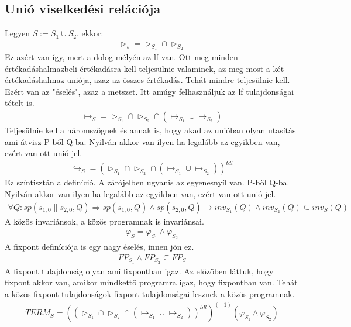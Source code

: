\documentclass{article}
\begin{document}
\subsection*{Unió viselkedési relációja}
Legyen $S:=S_1 \cup S_2$. ekkor:
\begin{align*}
\triangleright_s = \triangleright_{S_1} \cap \triangleright_{S_2}
\end{align*}
Ez azért van így, mert a dolog mélyén az lf van. Ott meg minden értékadáshalmazbeli értékadásra kell teljesülnie valaminek, az meg most a két értékadáshalmaz uniója, azaz az összes értékadás. Tehát mindre teljesülnie kell. Ezért van az "éselés", azaz a metszet. Itt amúgy felhasználjuk az lf tulajdonságai tételt is.
\begin{align*}
\mapsto_S = \triangleright_{S_1} \cap \triangleright_{S_2} \cap (\mapsto_{S_1} \cup \mapsto_{S_2})
\end{align*}
Teljesülnie kell a háromszögnek és annak is, hogy akad az unióban olyan utasítás ami átvisz P-ből Q-ba. Nyilván akkor van ilyen ha legalább az egyikben van, ezért van ott unió jel.
\begin{align*}
\hookrightarrow_S = (\triangleright_{S_1} \cap \triangleright_{S_2} \cap (\mapsto_{S_1} \cup \mapsto_{S_2}))^{tdl}
\end{align*}
Ez színtisztán a definíció. A zárójelben ugyanis az egyenesnyíl van.
P-ből Q-ba. Nyilván akkor van ilyen ha legalább az egyikben van, ezért van ott unió jel.
\begin{align*}
\forall Q:sp(s_{1,0}\parallel s_{2,0},Q) \Rightarrow sp(s_{1,0},Q) \land sp(s_{2,0},Q) \rightarrow inv_{S_1}(Q) \land inv_{S_2}(Q) \subseteq inv_S(Q)
\end{align*}
A közös invariánsok, a közös programnak is invariánsai.
\begin{align*}
\varphi_S = \varphi_{S_1} \land \varphi_{S_2}
\end{align*}
A fixpont definíciója is egy nagy éselés, innen jön ez.
\begin{align*}
FP_{S_1} \land FP_{S_2} \subseteq FP_S
\end{align*}
A fixpont tulajdonság olyan ami fixpontban igaz. Az előzőben láttuk, hogy fixpont akkor van, amikor mindkettő programra igaz, hogy fixpontban van. Tehát a közös fixpont-tulajdonságok fixpont-tulajdonságai lesznek a közös programnak.
\begin{align*}
TERM_S = ((\triangleright_{S_1} \cap \triangleright_{S_2} \cap (\mapsto_{S_1} \cup \mapsto_{S_2}))^{tdl})^{(-1)}(\varphi_{S_1} \land \varphi_{S_2})
\end{align*}
\end{document}
